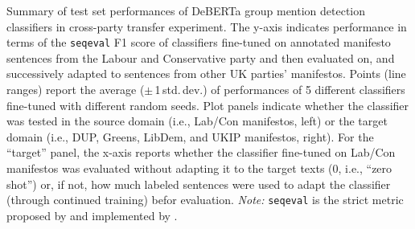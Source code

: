 Summary of test set performances of DeBERTa group mention detection classifiers in cross-party transfer experiment. The y-axis indicates performance in terms of the \texttt{seqeval} F1 score of classifiers fine-tuned on annotated manifesto sentences from the Labour and Conservative party and then evaluated on, and successively adapted to sentences from other UK parties' manifestos. Points (line ranges) report the average ($\pm$\,1\,std.\,dev.) of performances of 5 different classifiers fine-tuned with different random seeds. Plot panels indicate whether the classifier was tested in the source domain (i.e., Lab/Con manifestos, left) or the target domain (i.e., DUP, Greens, LibDem, and UKIP manifestos, right). For the ``target'' panel, the x-axis reports whether the classifier fine-tuned on Lab/Con manifestos was evaluated without adapting it to the target texts (0, i.e., ``zero shot'') or, if not, how much labeled sentences were used to adapt the classifier (through continued training) befor evaluation. \emph{Note:} \texttt{seqeval} is the strict metric proposed by \citet{ramshaw_text_1995} and implemented by \citet{nakayama_seqeval_2018}. \label{fig:uk-manifestos_cross-party-transfer_deberta-finetuning_testset}
